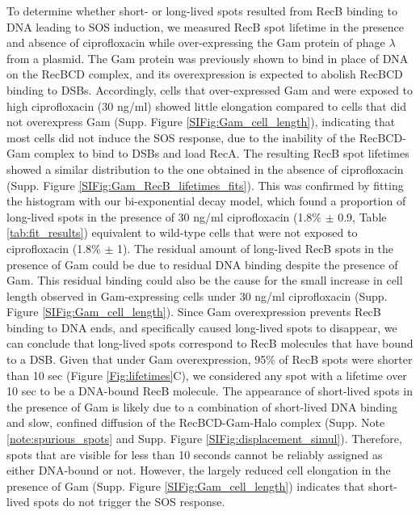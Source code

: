 To determine whether short- or long-lived spots resulted from RecB binding to DNA leading to SOS induction, we measured RecB spot lifetime in the presence and absence of ciprofloxacin while over-expressing the Gam protein of phage $\lambda$ from a plasmid. The Gam protein was previously shown to bind in place of DNA on the RecBCD complex\cite{Wilkinson2016}, and its overexpression is expected to abolish RecBCD binding to DSBs. Accordingly, cells that over-expressed Gam and were exposed to high ciprofloxacin (30 ng/ml) showed little elongation compared to cells that did not overexpress Gam (Supp. Figure \ref{SIFig:Gam_cell_length}), indicating that most cells did not induce the SOS response, due to the inability of the RecBCD-Gam complex to bind to DSBs and load RecA. The resulting RecB spot lifetimes showed a similar distribution to the one obtained in the absence of ciprofloxacin (Supp. Figure \ref{SIFig:Gam_RecB_lifetimes_fits}). This was confirmed by fitting the histogram with our bi-exponential decay model, which found a proportion of long-lived spots in the presence of 30 ng/ml ciprofloxacin (1.8\% $\pm$ 0.9, Table \ref{tab:fit_results}) equivalent to wild-type cells that were not exposed to ciprofloxacin (1.8\% $\pm$ 1). The residual amount of long-lived RecB spots in the presence of Gam could be due to residual DNA binding despite the presence of Gam. This residual binding could also be the cause for the small increase in cell length observed in Gam-expressing cells under 30 ng/ml ciprofloxacin (Supp. Figure \ref{SIFig:Gam_cell_length}). Since Gam overexpression prevents RecB binding to DNA ends, and specifically caused long-lived spots to disappear, we can conclude that long-lived spots correspond to RecB molecules that have bound to a DSB. Given that under Gam overexpression, 95\% of RecB spots were shorter than 10 sec (Figure \ref{Fig:lifetimes}C), we considered any spot with a lifetime over 10 sec to be a DNA-bound RecB molecule. The appearance of short-lived spots in the presence of Gam is likely due to a combination of short-lived DNA binding and slow, confined diffusion of the RecBCD-Gam-Halo complex (Supp. Note \ref{note:spurious_spots} and Supp. Figure \ref{SIFig:displacement_simul}). Therefore, spots that are visible for less than 10 seconds cannot be reliably assigned as either DNA-bound or not. However, the largely reduced cell elongation in the presence of Gam (Supp. Figure \ref{SIFig:Gam_cell_length}) indicates that short-lived spots do not trigger the SOS response.

